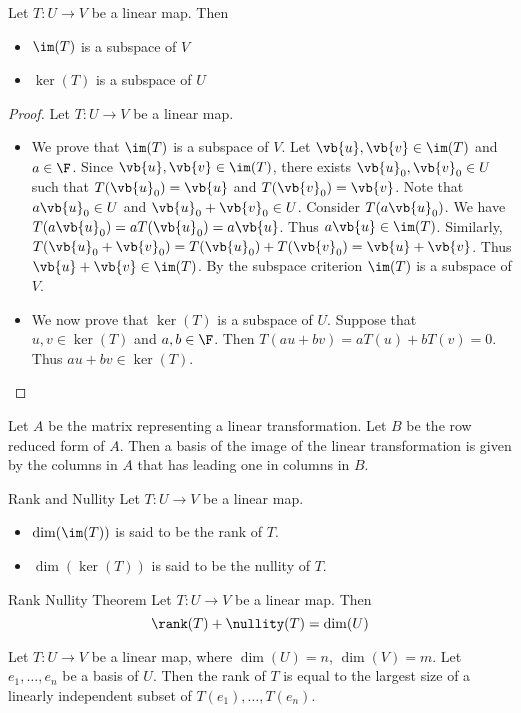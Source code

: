 \begin{thm}{}{} Let $T:U\to V$ be a linear map. Then
\begin{itemize}
\item $\im(T)$ is a subspace of $V$
\item $\ker(T)$ is a subspace of $U$
\end{itemize}\tcbline
\begin{proof} Let $T:U\to V$ be a linear map. 
\begin{itemize}
\item We prove that $\im(T)$ is a subspace of $V$. Let $\vb{u},\vb{v}\in\im(T)$ and $a\in\F$. Since $\vb{u},\vb{v}\in\im(T)$, there exists $\vb{u}_0,\vb{v}_0\in U$ such that $T(\vb{u}_0)=\vb{u}$ and $T(\vb{v}_0)=\vb{v}$. Note that $a\vb{u}_0\in U$ and $\vb{u}_0+\vb{v}_0\in U$. Consider $T(a\vb{u}_0)$. We have $T(a\vb{u}_0)=aT(\vb{u}_0)=a\vb{u}$. Thus $a\vb{u}\in\im(T)$. Similarly, $T(\vb{u}_0+\vb{v}_0)=T(\vb{u}_0)+T(\vb{v}_0)=\vb{u}+\vb{v}$. Thus $\vb{u}+\vb{v}\in\im(T)$. By the subspace criterion $\im(T)$ is a subspace of $V$. 
\item We now prove that $\ker(T)$ is a subspace of $U$. Suppose that $u,v\in\ker(T)$ and $a,b\in\F$. Then $T(au+bv)=aT(u)+bT(v)=0$. Thus $au+bv\in\ker(T)$. 
\end{itemize}
\end{proof}
\end{thm}

\begin{thm}{}{} Let $A$ be the matrix representing a linear transformation. Let $B$ be the row reduced form of $A$. Then a basis of the image of the linear transformation is given by the columns in $A$ that has leading one in columns in $B$. 
\end{thm}

\begin{defn}{Rank and Nullity}{} Let $T:U\to V$ be a linear map. 
\begin{itemize}
\item $\dim(\im(T))$ is said to be the rank of $T$. 
\item $\dim(\ker(T))$ is said to be the nullity of $T$. 
\end{itemize}
\end{defn}

\begin{thm}{Rank Nullity Theorem}{} Let $T:U\to V$ be a linear map. Then $$\rank(T)+\nullity(T)=\dim(U)$$
\end{thm}

\begin{thm}{}{} Let $T:U\to V$ be a linear map, where $\dim(U)=n$, $\dim(V)=m$. Let $e_1,\dots,e_n$ be a basis of $U$. Then the rank of $T$ is equal to the largest size of a linearly independent subset of $T(e_1),\dots,T(e_n)$. 
\end{thm}

